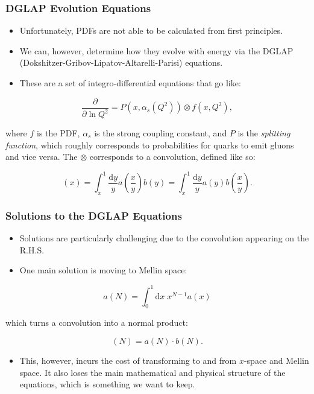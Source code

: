 \documentclass{beamer}
\newcommand{\dd}{\mathrm{d}}
\begin{document}
\begin{frame}
  \frametitle{DGLAP Evolution Equations}

  \begin{itemize}
  \item Unfortunately, PDFs are not able to be calculated from first principles.
  \item We can, however, determine how they evolve with energy via the DGLAP (Dokshitzer-Gribov-Lipatov-Altarelli-Parisi) equations.
  \item These are a set of integro-differential equations that go like:
  \end{itemize}

  \begin{equation}
    \frac{\partial}{\partial \ln Q^2} = P(x, \alpha_s(Q^2)) \otimes f(x, Q^2),
  \end{equation}

  where $f$ is the PDF, $\alpha_s$ is the strong coupling constant, and $P$ is the \textit{splitting function}, which roughly corresponds to probabilities for quarks to emit gluons and vice versa. The $\otimes$ corresponds to a convolution, defined like so:

  \begin{equation}
    [a \otimes b](x) = \int_x^1 \frac{\dd y}{y} a\left( \frac{x}{y} \right) b(y) = \int_x^1 \frac{\dd y}{y} a(y) b\left( \frac{x}{y} \right).
  \end{equation}

\end{frame}


\begin{frame}
  \frametitle{Solutions to the DGLAP Equations}

  \begin{itemize}
  \item Solutions are particularly challenging due to the convolution appearing on the R.H.S.
  \item One main solution is moving to Mellin space:
  \end{itemize}

  \begin{equation}
    a(N) = \int_0^1 \dd x \; x^{N-1}a(x)
  \end{equation}

  which turns a convolution into a normal product:

  \begin{equation}
    [a \otimes b](N) = a(N) \cdot b(N).
  \end{equation}

  \begin{itemize}
  \item This, however, incurs the cost of transforming to and from $x$-space and Mellin space. It also loses the main mathematical and physical structure of the equations, which is something we want to keep.
  \end{itemize}
\end{frame}
\end{document}
